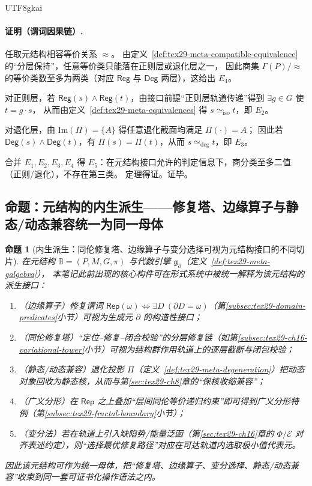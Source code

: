 \documentclass[12pt]{article}
\newtheorem{proposition}{命题}[section]
\newcommand{\KouJing}{\texorpdfstring{表述约定}{表述约定}}
\begin{document}
\begin{CJK*}{UTF8}{gkai}
\paragraph{证明（谓词因果链）.}
任取元结构相容等价关系 $\approx$。
由定义~\ref{def:tex29-meta-compatible-equivalence} 的“分层保持”，任意等价类只能落在正则层或退化层之一，
因此商集 $\Gamma(P)/\approx$ 的等价类数至多为两类（对应 $\mathsf{Reg}$ 与 $\mathsf{Deg}$ 两层），这给出 $E_4$。

对正则层，若 $\mathsf{Reg}(s)\wedge\mathsf{Reg}(t)$，由接口前提“正则层轨道传递”得到 $\exists g\in G$ 使 $t=g\cdot s$，
从而由定义~\ref{def:tex29-meta-equivalences} 得 $s\simeq_{\mathrm{iso}}t$，即 $E_2$。

对退化层，由 $\mathrm{Im}(\Pi)=\{A\}$ 得任意退化截面均满足 $\Pi(\cdot)=A$；
因此若 $\mathsf{Deg}(s)\wedge\mathsf{Deg}(t)$，有 $\Pi(s)=\Pi(t)$，从而 $s\simeq_{\mathrm{deg}}t$，即 $E_3$。

合并 $E_1,E_2,E_3,E_4$ 得 $E_5$：在元结构接口允许的判定信息下，商分类至多二值（正则/退化），不存在第三类。
定理得证。证毕。

\subsection{命题：元结构的内生派生——修复塔、边缘算子与静态/动态兼容统一为同一母体}
\label{subsec:tex29-meta-derivation}

\begin{proposition}[内生派生：同伦修复塔、边缘算子与变分选择可视为元结构接口的不同切片]
\label{prop:tex29-meta-derivation}
在元结构 $\mathbb{B}=(P,M,G,\pi)$ 与代数引擎 $\mathfrak{g}_{\partial}$（定义~\ref{def:tex29-meta-galgebra}），
本笔记此前出现的核心构件可在形式系统中被统一解释为该元结构的派生接口：
\begin{enumerate}
  \item （边缘算子）修复谓词 $\mathsf{Rep}(\omega)\Longleftrightarrow \exists D\ (\partial D=\omega)$（第\ref{subsec:tex29-domain-predicates}小节）可视为生成元 $\partial$ 的构造性接口；
  \item （同伦修复塔）“定位--修复--闭合校验”的分层修复链（如第\ref{subsec:tex29-ch16-variational-tower}小节）可视为结构群作用轨道上的逐层截断与闭包校验；
  \item （静态/动态兼容）退化投影 $\Pi$（定义~\ref{def:tex29-meta-degeneration}）把动态对象回收为静态核，从而与第\ref{sec:tex29-ch8}章的“保核收缩兼容”；

  \item （广义分形）在 $\mathsf{Rep}$ 之上叠加“层间同伦等价递归约束”即可得到广义分形特例（第\ref{subsec:tex29-fractal-boundary}小节）；
  \item （变分法）若在轨道上引入缺陷势/能量泛函（第\ref{sec:tex29-ch16}章的 $\Phi/\mathcal{E}$ 对齐\KouJing），则“选择最优修复路径”对应在可达轨道内选取极小值代表元。
\end{enumerate}
因此该元结构可作为统一母体，把“修复塔、边缘算子、变分选择、静态/动态兼容”收束到同一套可证书化操作语法之内。
\end{proposition}


\end{CJK*}
\end{document}
